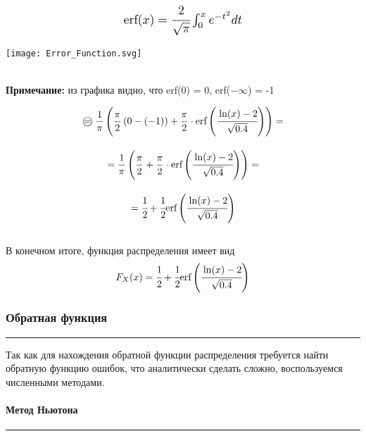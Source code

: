 \documentclass[a4paper, 14pt]{extarticle}
\begin{document}
\begin{minipage}[c]{0.5\textwidth}
    \begin{equation*}
        \scalebox{1.25}{$\text{erf} (x) = \cfrac{2}{\sqrt{\pi}} \int_{0}^{x} e^{-t^2} dt$}
    \end{equation*}
\end{minipage}
\hfill
\begin{minipage}[c]{0.5\textwidth}
    \texttt{[image: Error\_Function.svg]}
\end{minipage}\\

{\footnotesize \textbf{Примечание:} из графика видно, что erf(0) = 0, erf($-\infty$) = -1}


\begin{gather*}
    \oeq \hspace{3pt} \frac{1}{\pi} \left( \frac{\pi}{2} \left( 0 - \left( -1 \right) \right) + 
    \frac{\pi}{2} \cdot \text{erf} \left( \cfrac{\ln(x)-2}{\sqrt{0.4}} \right) \right) = \\[1em]
    = \frac{1}{\pi} \left( \frac{\pi}{2} + \frac{\pi}{2} \cdot \text{erf} \left( 
    \cfrac{\ln(x) - 2}{\sqrt{0.4}} \right) \right) = \\[1em]
    = \cfrac{1}{2} + \cfrac{1}{2} \text{erf} \left( \cfrac{\ln(x) - 2}{\sqrt{0.4}} \right)
\end{gather*}\\
\vspace{-10pt}
В конечном итоге, функция распределения имеет вид\\[1em]
\begin{equation}
    F_X(x) = \cfrac{1}{2} + \cfrac{1}{2} \text{erf} \left( \cfrac{\ln(x) - 2}{\sqrt{0.4}} \right)
\end{equation}

\subsubsection{Обратная функция}\vspace{-20pt}\rule{\linewidth}{0.1mm}

Так как для нахождения обратной функции распределения требуется найти обратную 
функцию ошибок, что аналитически сделать сложно, воспользуемся численными методами.

\paragraph{Метод Ньютона}\vspace{-20pt}\rule{\linewidth}{0.1mm}
\end{document}
